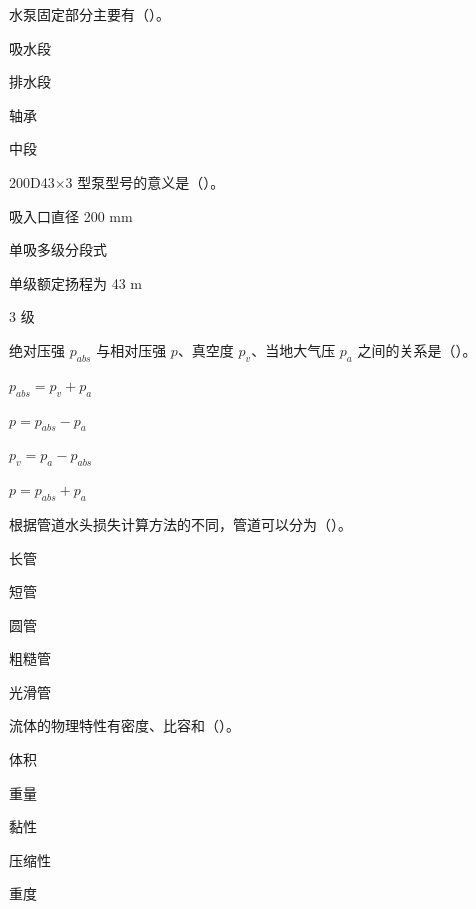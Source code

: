 \begin{ti}
\item 水泵固定部分主要有（\quad）。
\begin{choices}
\item 吸水段
\item 排水段
\item 轴承
\item 中段
\end{choices}

\item 200D43$\times$3 型泵型号的意义是（\quad）。
\begin{choices}
\item 吸入口直径 200 mm
\item 单吸多级分段式
\item 单级额定扬程为 43 m
\item 3 级
\end{choices}

\item 绝对压强 $p_{abs}$ 与相对压强 $p$、真空度 $p_v$、当地大气压 $p_a$ 之间的关系是（\quad）。
\begin{choices}
\item $p_{abs}=p_v+p_a$
\item $p=p_{abs}-p_a$
\item $p_v=p_a-p_{abs}$
\item $p=p_{abs}+p_a$
\end{choices}

\item 根据管道水头损失计算方法的不同，管道可以分为（\quad）。
\begin{choices}
\item 长管
\item 短管
\item 圆管
\item 粗糙管
\item 光滑管
\end{choices}

\item 流体的物理特性有密度、比容和（\quad）。
\begin{choices}
\item 体积
\item 重量
\item 黏性
\item 压缩性
\item 重度
\end{choices}


\end{ti}
